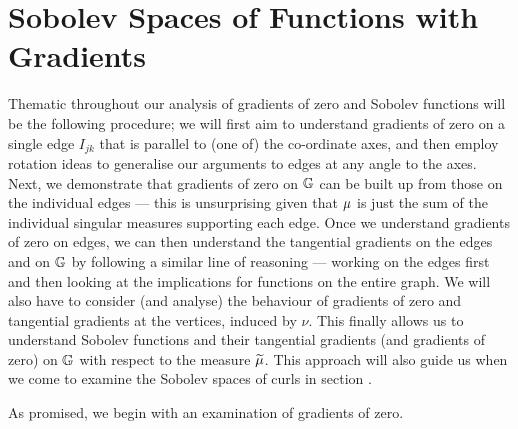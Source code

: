 \section{Sobolev Spaces of Functions with Gradients} \label{ssec:3DGradSobSpaces}


Thematic throughout our analysis of gradients of zero and Sobolev functions will be the following procedure; we will first aim to understand gradients of zero on a single edge $I_{jk}$ that is parallel to (one of) the co-ordinate axes, and then employ rotation ideas to generalise our arguments to edges at any angle to the axes.
Next, we demonstrate that gradients of zero on $\mathbb{G}$ can be built up from those on the individual edges --- this is unsurprising given that $\mu$ is just the sum of the individual singular measures supporting each edge.
Once we understand gradients of zero on edges, we can then understand the tangential gradients on the edges and on $\mathbb{G}$ by following a similar line of reasoning --- working on the edges first and then looking at the implications for functions on the entire graph.
We will also have to consider (and analyse) the behaviour of gradients of zero and tangential gradients at the vertices, induced by $\nu$.
This finally allows us to understand Sobolev functions and their tangential gradients (and gradients of zero) on $\mathbb{G}$ with respect to the measure $\widetilde{\mu}$.
This approach will also guide us when we come to examine the Sobolev spaces of curls in section .

As promised, we begin with an examination of gradients of zero. 

